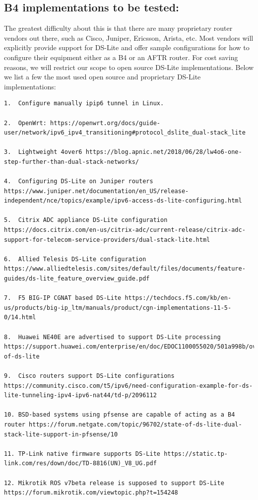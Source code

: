 \documentclass[a4paper,12p,titlepage]{article}
\begin{document}
\subsection{B4 implementations to be tested:}
The greatest difficulty about this is that there are many proprietary router vendors out there, such as Cisco, Juniper, Ericsson, Arista, etc. Most vendors will explicitly provide support for DS-Lite and offer sample configurations for how to configure their equipment either as a B4 or an AFTR router.
For cost saving reasons, we will restrict our scope to open source DS-Lite implementations.
Below we list a few the most used open source and proprietary DS-Lite implementations:

\begin{lstlisting}[basicstyle=\tiny]
1.	Configure manually ipip6 tunnel in Linux.

2.	OpenWrt: https://openwrt.org/docs/guide-user/network/ipv6_ipv4_transitioning#protocol_dslite_dual-stack_lite

3.	Lightweight 4over6 https://blog.apnic.net/2018/06/28/lw4o6-one-step-further-than-dual-stack-networks/

4.	Configuring DS-Lite on Juniper routers https://www.juniper.net/documentation/en_US/release-independent/nce/topics/example/ipv6-access-ds-lite-configuring.html

5.	Citrix ADC appliance DS-Lite configuration https://docs.citrix.com/en-us/citrix-adc/current-release/citrix-adc-support-for-telecom-service-providers/dual-stack-lite.html

6.	Allied Telesis DS-Lite configuration https://www.alliedtelesis.com/sites/default/files/documents/feature-guides/ds-lite_feature_overview_guide.pdf

7.	F5 BIG-IP CGNAT based DS-Lite https://techdocs.f5.com/kb/en-us/products/big-ip_ltm/manuals/product/cgn-implementations-11-5-0/14.html

8.	Huawei NE40E are advertised to support DS-Lite processing https://support.huawei.com/enterprise/en/doc/EDOC1100055020/501a998b/overview-of-ds-lite

9.	Cisco routers support DS-Lite configurations https://community.cisco.com/t5/ipv6/need-configuration-example-for-ds-lite-tunneling-ipv4-ipv6-nat44/td-p/2096112

10.	BSD-based systems using pfsense are capable of acting as a B4 router https://forum.netgate.com/topic/96702/state-of-ds-lite-dual-stack-lite-support-in-pfsense/10

11.	TP-Link native firmware supports DS-Lite https://static.tp-link.com/res/down/doc/TD-8816(UN)_V8_UG.pdf

12.	Mikrotik ROS v7beta release is supposed to support DS-Lite https://forum.mikrotik.com/viewtopic.php?t=154248
\end{lstlisting}
\end{document}
